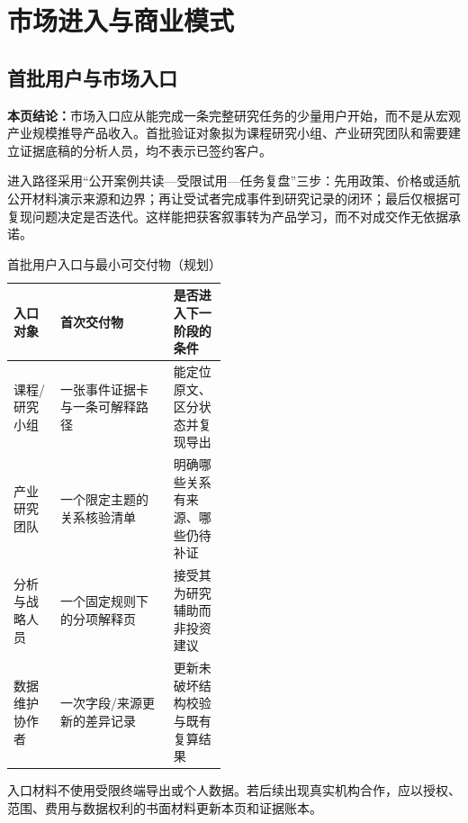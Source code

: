 \clearpage
\section{市场进入与商业模式}
\subsection*{首批用户与市场入口}\label{page:36}
\fi

\textbf{本页结论：}市场入口应从能完成一条完整研究任务的少量用户开始，而不是从宏观产业规模推导产品收入。首批验证对象拟为课程研究小组、产业研究团队和需要建立证据底稿的分析人员，均不表示已签约客户。

进入路径采用“公开案例共读—受限试用—任务复盘”三步：先用政策、价格或适航公开材料演示来源和边界；再让受试者完成事件到研究记录的闭环；最后仅根据可复现问题决定是否迭代。这样能把获客叙事转为产品学习，而不对成交作无依据承诺。

\begin{table}[htbp]
\centering
\caption{首批用户入口与最小可交付物（规划）}
\label{tab:wty-market-entry}
\small
\begin{tabularx}{\linewidth}{p{0.22\linewidth}X p{0.25\linewidth}}
\toprule
入口对象 & 首次交付物 & 是否进入下一阶段的条件 \\
\midrule
课程/研究小组 & 一张事件证据卡与一条可解释路径 & 能定位原文、区分状态并复现导出 \\
产业研究团队 & 一个限定主题的关系核验清单 & 明确哪些关系有来源、哪些仍待补证 \\
分析与战略人员 & 一个固定规则下的分项解释页 & 接受其为研究辅助而非投资建议 \\
数据维护协作者 & 一次字段/来源更新的差异记录 & 更新未破坏结构校验与既有复算结果 \\
\bottomrule
\end{tabularx}
\end{table}

入口材料不使用受限终端导出或个人数据。若后续出现真实机构合作，应以授权、范围、费用与数据权利的书面材料更新本页和证据账本。
